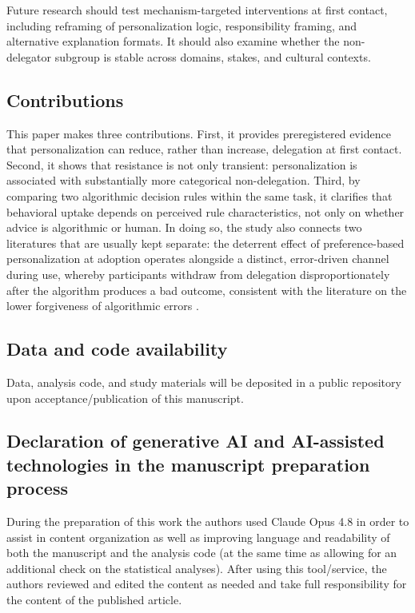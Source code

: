\documentclass[a4paper, 12pt, fleqn]{article}
\theoremstyle{definition}
\begin{document}
Future research should test mechanism-targeted interventions at first contact, including reframing of personalization logic, responsibility framing, and alternative explanation formats. It should also examine whether the non-delegator subgroup is stable across domains, stakes, and cultural contexts.

\subsection{Contributions}
This paper makes three contributions. First, it provides preregistered evidence that personalization can reduce, rather than increase, delegation at first contact. Second, it shows that resistance is not only transient: personalization is associated with substantially more categorical non-delegation. Third, by comparing two algorithmic decision rules within the same task, it clarifies that behavioral uptake depends on perceived rule characteristics, not only on whether advice is algorithmic or human. In doing so, the study also connects two literatures that are usually kept separate: the deterrent effect of preference-based personalization at adoption operates alongside a distinct, error-driven channel during use, whereby participants withdraw from delegation disproportionately after the algorithm produces a bad outcome, consistent with the literature on the lower forgiveness of algorithmic errors \citep{Dietvorst2018,Renier2021}.

\subsection{Data and code availability}
Data, analysis code, and study materials will be deposited in a public repository upon acceptance/publication of this manuscript. 


\subsection{Declaration of generative AI and AI-assisted technologies in the manuscript preparation process}
During the preparation of this work the authors used Claude Opus 4.8 in order to assist in content organization as well as improving language and readability of both the manuscript and the analysis code (at the same time as allowing for an additional check on the statistical analyses). After using this tool/service, the authors reviewed and edited the content as needed and take full responsibility for the content of the published article.


\newpage
\thispagestyle{plain}
\addtolength{\topmargin}{-.5cm}
\addtolength{\textheight}{.8cm}



\end{document}
